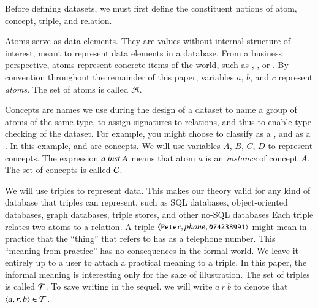 \documentclass{elsarticle}
\begin{document}
   Before defining datasets, we must first define the constituent notions of atom, concept, triple, and relation.
   
   Atoms serve as data elements.
   They are values without internal structure of interest, meant to represent data elements in a database.
   From a business perspective, atoms represent concrete items of the world,
   such as , , or .
   By convention throughout the remainder of this paper, variables $a$, $b$, and $c$ represent \emph{atoms}.
   The set of atoms is called $\mathcal{A}$.
   
   Concepts are names we use during the design of a dataset
   to name a group of atoms of the same type,
   to assign signatures to relations, and thus
   to enable type checking of the dataset.
   For example, you might choose to classify  as a , and  as a .
   In this example,  and  are concepts.
   We will use variables $A$, $B$, $C$, $D$ to represent concepts.
   The expression $a\ \inst\ A$ means that atom $a$ is an \emph{instance} of concept $A$.
   The set of concepts is called $\mathcal{C}$.
   
   We will use triples to represent data.
   This makes our theory valid for any kind of database that triples can represent,
   such as SQL databases, object-oriented databases, graph databases, triple stores, and other no-SQL databases
   Each triple relates two atoms to a relation.
   A triple $\langle{\text{{\tt\small Peter}}},{\text{\it phone\/}},{\text{{\tt\small 074238991}}}\rangle$ might mean in practice that
   the ``thing'' that  refers to has  as a telephone number.
   This ``meaning from practice'' has no consequences in the formal world.
   We leave it entirely up to a user to attach a practical meaning to a triple.
   In this paper, the informal meaning is interesting only for the sake of illustration.
   The set of triples is called $\mathcal{T}$.
   To save writing in the sequel, we will write $a\ r\ b$ to denote that $\langle{a},{r},{b}\rangle\in\mathcal{T}$.
\end{document}
